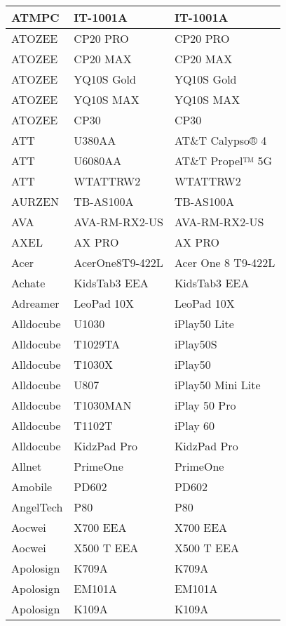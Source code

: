 \begin{tabularx}{\linewidth}{|l|X|X|}
        ATMPC & IT-1001A & IT-1001A \\ \hline
        ATOZEE & CP20 PRO & CP20 PRO \\ \hline
        ATOZEE & CP20 MAX & CP20 MAX \\ \hline
        ATOZEE & YQ10S Gold & YQ10S Gold \\ \hline
        ATOZEE & YQ10S MAX & YQ10S MAX \\ \hline
        ATOZEE & CP30 & CP30 \\ \hline
        ATT & U380AA & AT\&T Calypso® 4 \\ \hline
        ATT & U6080AA & AT\&T Propel™ 5G \\ \hline
        ATT & WTATTRW2 & WTATTRW2 \\ \hline
        AURZEN & TB-AS100A & TB-AS100A \\ \hline
        AVA & AVA-RM-RX2-US & AVA-RM-RX2-US \\ \hline
        AXEL & AX PRO & AX PRO \\ \hline
        Acer & AcerOne8T9-422L & Acer One 8 T9-422L \\ \hline
        Achate & KidsTab3 EEA & KidsTab3 EEA \\ \hline
        Adreamer & LeoPad 10X & LeoPad 10X \\ \hline
        Alldocube & U1030 & iPlay50 Lite \\ \hline
        Alldocube & T1029TA & iPlay50S \\ \hline
        Alldocube & T1030X & iPlay50 \\ \hline
        Alldocube & U807 & iPlay50 Mini Lite \\ \hline
        Alldocube & T1030MAN & iPlay 50 Pro \\ \hline
        Alldocube & T1102T & iPlay 60 \\ \hline
        Alldocube & KidzPad Pro & KidzPad Pro \\ \hline
        Allnet & PrimeOne & PrimeOne \\ \hline
        Amobile & PD602 & PD602 \\ \hline
        AngelTech & P80 & P80 \\ \hline
        Aocwei & X700 EEA & X700 EEA \\ \hline
        Aocwei & X500 T EEA & X500 T EEA \\ \hline
        Apolosign & K709A & K709A \\ \hline
        Apolosign & EM101A & EM101A \\ \hline
        Apolosign & K109A & K109A \\ \hline

\end{tabularx}

